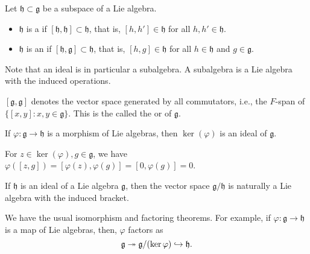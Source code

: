 \documentclass[12pt]{article}
\begin{document}
\begin{defn}
	Let $\mathfrak{h} \subset \mathfrak{g}$ be a subspace of a Lie algebra.
	\begin{itemize}
		\item $\mathfrak{h}$ is a  if $[\mathfrak{h}, \mathfrak{h}] \subset \mathfrak{h}$, that is, $[h, h'] \in \mathfrak{h}$ for all $h, h' \in \mathfrak{h}$.
		\item $\mathfrak{h}$ is an  if $[\mathfrak{h}, \mathfrak{g}] \subset \mathfrak{h}$, that is, $[h, g] \in \mathfrak{h}$ for all $h \in \mathfrak{h}$ and $g \in \mathfrak{g}$.
	\end{itemize}
\end{defn}
Note that an ideal is in particular a subalgebra. 
A subalgebra is a Lie algebra with the induced operations.

\begin{defn}
	$[\mathfrak{g}, \mathfrak{g}]$ denotes the vector space generated by all commutators, i.e., the $F$-span of $\{[x, y] : x, y \in \mathfrak{g}\}$. \newline
	This is the called the  or  of $\mathfrak{g}$.
\end{defn}

\begin{thm}
	If $\varphi \colon \mathfrak{g} \to \mathfrak{h}$ is a morphism of Lie algebras, then $\ker(\varphi)$ is an ideal of $\mathfrak{g}$.
\end{thm}
\begin{sketch} 
	For $z \in \ker(\varphi), g \in \mathfrak{g}$, we have $\varphi([z, g]) = [\varphi(z), \varphi(g)] = [0, \varphi(g)] = 0$.
\end{sketch}

\begin{thm}
	If $\mathfrak{h}$ is an ideal of a Lie algebra $\mathfrak{g}$, then the vector space $\mathfrak{g}/\mathfrak{h}$ is naturally a Lie algebra with the induced bracket.
\end{thm}

\begin{rem}
	We have the usual isomorphism and factoring theorems. For example, if $\varphi \colon \mathfrak{g} \to \mathfrak{h}$ is a map of Lie algebras, then, $\varphi$ factors as
	\begin{equation*} 
		\mathfrak{g} \twoheadrightarrow \mathfrak{g}/(\ker \varphi) \hookrightarrow \mathfrak{h}.
	\end{equation*}
\end{rem}
\end{document}
